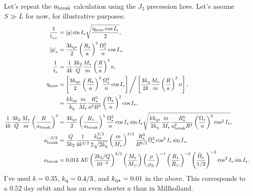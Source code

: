 \documentclass[11pt,
        usenames, %
        dvipsnames %
    ]{article}
\newcommand*{\abs}[1]{\left|#1\right|}
\newcommand*{\p}[1]{\left(#1\right)}
\newcommand*{\s}[1]{\left[#1\right]}
\begin{document}
Let's repeat the $a_{\rm break}$ calculation using the $J_2$ precession laws.
Let's assume $S \gg L$ for now, for illustrative purposes:
\begin{align}
    \frac{1}{t_{\rm s, c}} &= \abs{g}\sin I_\star \sqrt{\frac{\eta_{\rm sync}
        \cos I_\star}{2}},\\
    \abs{g}_\star &= \frac{3k_{\rm q \star}}{2} \p{\frac{R_\star}{a}}^5
            \frac{\Omega_{\rm \star}^2}{n} \cos I_\star,\\
    \frac{1}{t_{\rm s}} &= \frac{1}{4k}\frac{3k_2}{Q} \frac{M_{\star}}{m}
        \p{\frac{R}{a}}^3 n,\\
    \eta_{\rm sync} &= \s{\frac{3k_{\rm q \star}}{2} \p{\frac{R_\star}{a}}^5
            \frac{\Omega_{\rm \star}^2}{n} \cos I_\star}
        \Bigg/ \s{\frac{3k_{\rm q}}{2k} \frac{M_\star}{m}\p{\frac{R}{a}}^3 n},\\
        &= \frac{k k_{\rm q \star}}{k_{\rm q}}
            \frac{m}{M_\star}
            \frac{R_\star^5}{a^2R^3}
            \p{\frac{\Omega_{\star}}{n}}^2
            \cos I_\star,\\
    \frac{1}{4k}\frac{3k_2}{Q} \frac{M_\star}{m} \p{\frac{R}{a_{\rm break}}}^3
        &= \frac{3k_{\rm q \star}}{2} \p{\frac{R_\star}{a_{\rm break}}}^5
            \frac{\Omega_{\rm \star}^2}{n} \cos I_\star
            \sin I_\star
            \sqrt{\frac{k k_{\rm q \star}}{2k_{\rm q}}
            \frac{m}{M_\star}
            \frac{R_\star^5}{a_{\rm break}^2R^3}
            \p{\frac{\Omega_{\star}}{n}}^2
            \cos^2 I_\star},\\
    a_{\rm break}^{-3/2}
        &= \frac{Q}{3k_2}\frac{1}{4k^{3/2}}
            \frac{k_{\rm q\star}^{3/2}}{2\sqrt{2k_{\rm q}}}
            \p{\frac{m}{M_\star}}^{3/2}
            \frac{R_\star^{3}}{R^{9/2}}
            \hat{\Omega}_{\star}^3
            \cos^2 I_\star \sin I_\star,\\
    a_{\rm break} &= 0.013 \;\mathrm{AU}
            \p{\frac{2k_2/Q}{10^{-3}}}^{2/3}
            \p{\frac{M_\star}{M_{\odot}}}
            \p{\frac{\rho}{\rho_{\oplus}}}^{-1}
            \p{\frac{R_\star}{R_\odot}}^{-2}
            \p{\frac{\hat{\Omega}_{\star}}{1/3}}^{-2}
            \cos^2 I_\star \sin I_\star.
\end{align}
I've used $k = 0.35$, $k_{\rm q} = 0.4/3$, and $k_{\rm q\star} = 0.01$ in the
above. This corresponds to a $0.52\;\mathrm{day}$ orbit and has an even shorter
$a$ than in Millholland.
\end{document}
